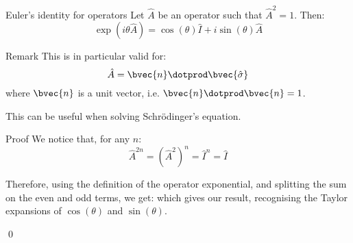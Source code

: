 \documentclass[a4paper]{article}
\begin{document}
\begin{parag}{Euler's identity for operators}
    Let $\hat{A}$ be an operator such that $\hat{A}^2 = 1$. Then: 
    \[\exp\left(i \theta \hat{A}\right) = \cos\left(\theta\right) \hat{I} + i\sin\left(\theta\right)\hat{A}\]
    
    \begin{subparag}{Remark}
        This is in particular valid for: 
        \[\hat{A} = \bvec{n} \dotprod \bvec{\hat{\sigma}}\]
        where $\bvec{n}$ is a unit vector, i.e. $\bvec{n} \dotprod \bvec{n} = 1$.

        This can be useful when solving Schrödinger's equation.
    \end{subparag}

    \begin{subparag}{Proof}
        We notice that, for any $n$: 
        \[\hat{A}^{2n} = \left(\hat{A}^2\right)^n = \hat{I}^n = \hat{I}\]

        Therefore, using the definition of the operator exponential, and splitting the sum on the even and odd terms, we get: 
        which gives our result, recognising the Taylor expansions of $\cos\left(\theta\right)$ and $\sin\left(\theta\right)$.

        \qed
    \end{subparag}
\end{parag}
\end{document}
